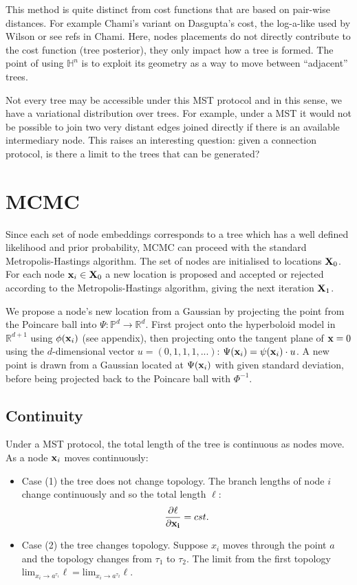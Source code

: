 \documentclass[11pt]{article}
\newcommand{\be}{\begin{equation*}}
\newcommand{\ee}{\end{equation*}}
\begin{document}
This method is quite distinct from cost functions that are based on pair-wise distances. For example Chami's variant on Dasgupta's cost, the log-a-like used by Wilson or see refs in Chami. Here, nodes placements do not directly contribute to the cost function (tree posterior), they only impact how a tree is formed. The point of using $\mathbb{H}^{n}$ is to exploit its geometry as a way to move between ``adjacent'' trees.

Not every tree may be accessible under this MST protocol and in this sense, we have a variational distribution over trees.
For example, under a MST it would not be possible to join two very distant edges joined directly if there is an available intermediary node.
This raises an interesting question: given a connection protocol, is there a limit to the trees that can be generated?

\section{MCMC}
Since each set of node embeddings corresponds to a tree which has a well defined likelihood and prior probability, MCMC can proceed with the standard Metropolis-Hastings algorithm.
The set of nodes are initialised to locations $\bold{X}_{0}$.
For each node $\bold{x}_{i} \in \bold{X}_{0}$ a new location is proposed and accepted or rejected according to the Metropolis-Hastings algorithm, giving the next iteration $\bold{X}_{1}$.

We propose a node's new location from a Gaussian by projecting the point from the Poincare ball into $\Psi: \mathbb{P}^{d} \to \mathbb{R}^{d}$.
First project onto the hyperboloid model in $\mathbb{R}^{d+1}$ using $\phi(\bold{x}_{i})$ (see appendix), then projecting onto the tangent plane of $\bold{x}=0$ using the $d$-dimensional vector $u=(0, 1, 1, 1,...)$: $\Psi(\bold{x}_{i}) = \psi(\bold{x}_{i}) \cdot u $.
A new point is drawn from a Gaussian located at $\Psi(\bold{x}_{i})$ with given standard deviation, before being projected back to the Poincare ball with $\Phi^{-1}$.

\subsection{Continuity}
Under a MST protocol, the total length of the tree is continuous as nodes move.
As a node $\bold{x}_{i}$ moves continuously:
\begin{itemize}
\item Case (1) the tree does not change topology. The branch lengths of node $i$ change continuously and so the total length $\ell$:
\be
\dfrac{\partial \ell}{\partial \bold{x_{i}}} = cst.
\ee
\item Case (2) the tree changes topology. Suppose $x_{i}$ moves through the point $a$ and the topology changes from $\tau_{1}$ to $\tau_{2}$. The limit from the first topology $\text{lim}_{x_{i} \to a^{\tau_{1}}} \ell = \text{lim}_{x_{i} \to a^{\tau_{2}}} \ell$.
\end{itemize}
\end{document}

